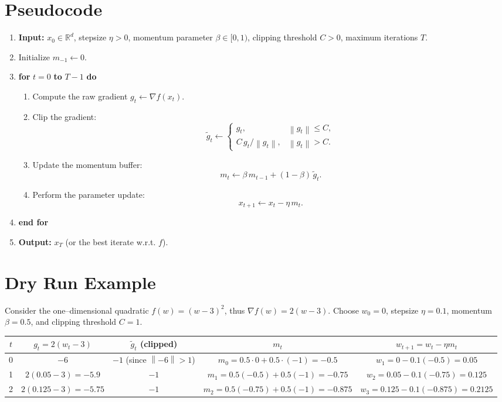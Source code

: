 \documentclass{article}
\newcommand{\norm}[1]{\left\lVert#1\right\rVert}
\begin{document}
\section*{Pseudocode}
\begin{enumerate}[leftmargin=*, label=Step \arabic*:, align=left]
\item \textbf{Input:} $x_{0}\in\mathbb{R}^{d}$, stepsize $\eta>0$, momentum
parameter $\beta\in[0,1)$, clipping threshold $C>0$, maximum iterations $T$.
\item Initialize $m_{-1}\gets 0$.
\item \textbf{for} $t=0$ \textbf{to} $T-1$ \textbf{do}
\begin{enumerate}[label=\arabic*.]
\item Compute the raw gradient $g_{t}\gets \nabla f(x_{t})$.
\item Clip the gradient:
\[
\tilde g_{t}\gets
\begin{cases}
g_{t}, & \norm{g_{t}}\le C,\\[2pt]
C\,g_{t}/\norm{g_{t}}, & \norm{g_{t}}>C.
\end{cases}
\]
\item Update the momentum buffer:
\[
m_{t}\gets \beta\, m_{t-1} + (1-\beta)\,\tilde g_{t}.
\]
\item Perform the parameter update:
\[
x_{t+1}\gets x_{t} - \eta\, m_{t}.
\]
\end{enumerate}
\item \textbf{end for}
\item \textbf{Output:} $x_{T}$ (or the best iterate w.r.t. $f$).
\end{enumerate}

\section*{Dry Run Example}
Consider the one–dimensional quadratic $f(w)=(w-3)^{2}$, thus
$\nabla f(w)=2(w-3)$.  Choose $w_{0}=0$, stepsize $\eta=0.1$, momentum
$\beta=0.5$, and clipping threshold $C=1$.

\begin{center}
\begin{tabular}{c|c|c|c|c}
$t$ & $g_{t}=2(w_{t}-3)$ & $\tilde g_{t}$ (clipped) & $m_{t}$ & $w_{t+1}=w_{t}-\eta m_{t}$\\ \hline
0 & $-6$ & $-1$ (since $\norm{-6}>1$) & $m_{0}=0.5\cdot0+0.5\cdot(-1)=-0.5$ &
$w_{1}=0-0.1(-0.5)=0.05$\\[4pt]
1 & $2(0.05-3)=-5.9$ & $-1$ & $m_{1}=0.5(-0.5)+0.5(-1)=-0.75$ &
$w_{2}=0.05-0.1(-0.75)=0.125$\\[4pt]
2 & $2(0.125-3)=-5.75$ & $-1$ & $m_{2}=0.5(-0.75)+0.5(-1)=-0.875$ &
$w_{3}=0.125-0.1(-0.875)=0.2125$
\end{tabular}
\end{center}
\end{document}

